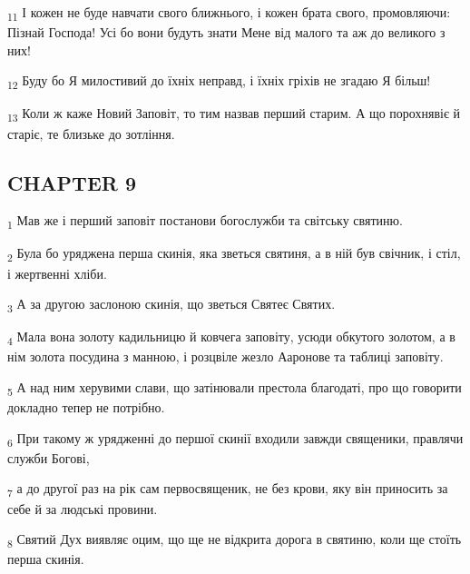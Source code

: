 \begin{tcolorbox}
\textsubscript{11} І кожен не буде навчати свого ближнього, і кожен брата свого, промовляючи: Пізнай Господа! Усі бо вони будуть знати Мене від малого та аж до великого з них!
\end{tcolorbox}
\begin{tcolorbox}
\textsubscript{12} Буду бо Я милостивий до їхніх неправд, і їхніх гріхів не згадаю Я більш!
\end{tcolorbox}
\begin{tcolorbox}
\textsubscript{13} Коли ж каже Новий Заповіт, то тим назвав перший старим. А що порохнявіє й старіє, те близьке до зотління.
\end{tcolorbox}
\subsection{CHAPTER 9}
\begin{tcolorbox}
\textsubscript{1} Мав же і перший заповіт постанови богослужби та світську святиню.
\end{tcolorbox}
\begin{tcolorbox}
\textsubscript{2} Була бо уряджена перша скинія, яка зветься святиня, а в ній був свічник, і стіл, і жертвенні хліби.
\end{tcolorbox}
\begin{tcolorbox}
\textsubscript{3} А за другою заслоною скинія, що зветься Святеє Святих.
\end{tcolorbox}
\begin{tcolorbox}
\textsubscript{4} Мала вона золоту кадильницю й ковчега заповіту, усюди обкутого золотом, а в нім золота посудина з манною, і розцвіле жезло Ааронове та таблиці заповіту.
\end{tcolorbox}
\begin{tcolorbox}
\textsubscript{5} А над ним херувими слави, що затінювали престола благодаті, про що говорити докладно тепер не потрібно.
\end{tcolorbox}
\begin{tcolorbox}
\textsubscript{6} При такому ж урядженні до першої скинії входили завжди священики, правлячи служби Богові,
\end{tcolorbox}
\begin{tcolorbox}
\textsubscript{7} а до другої раз на рік сам первосвященик, не без крови, яку він приносить за себе й за людські провини.
\end{tcolorbox}
\begin{tcolorbox}
\textsubscript{8} Святий Дух виявляє оцим, що ще не відкрита дорога в святиню, коли ще стоїть перша скинія.
\end{tcolorbox}
